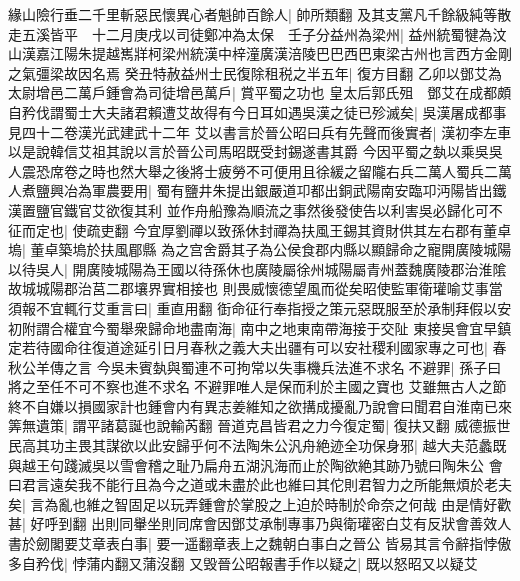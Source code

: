 緣山險行垂二千里斬惡民懷異心者魁帥百餘人|{
	帥所類翻}
及其支黨凡千餘級純等散走五溪皆平　十二月庚戌以司徒鄭冲為太保　壬子分益州為梁州|{
	益州統蜀犍為汶山漢嘉江陽朱提越嶲牂柯梁州統漢中梓潼廣漢涪陵巴巴西巴東梁古州也言西方金剛之氣彊梁故因名焉}
癸丑特赦益州士民復除租税之半五年|{
	復方目翻}
乙卯以鄧艾為太尉增邑二萬戶鍾會為司徒增邑萬戶|{
	賞平蜀之功也}
皇太后郭氏殂　鄧艾在成都頗自矜伐謂蜀士大夫諸君賴遭艾故得有今日耳如遇吳漢之徒已殄滅矣|{
	吳漢屠成都事見四十二卷漢光武建武十二年}
艾以書言於晉公昭曰兵有先聲而後實者|{
	漢初李左車以是說韓信艾祖其說以言於晉公司馬昭既受封錫遂書其爵}
今因平蜀之埶以乘吳吳人震恐席卷之時也然大舉之後將士疲勞不可便用且徐緩之留隴右兵二萬人蜀兵二萬人煮鹽興冶為軍農要用|{
	蜀有鹽井朱提出銀嚴道卭都出銅武陽南安臨卭沔陽皆出鐵漢置鹽官鐵官艾欲復其利}
並作舟船豫為順流之事然後發使告以利害吳必歸化可不征而定也|{
	使疏吏翻}
今宜厚劉禪以致孫休封禪為扶風王錫其資財供其左右郡有董卓塢|{
	董卓築塢於扶風郿縣}
為之宫舍爵其子為公侯食郡内縣以顯歸命之寵開廣陵城陽以待吳人|{
	開廣陵城陽為王國以待孫休也廣陵屬徐州城陽屬青州蓋魏廣陵郡治淮隂故城城陽郡治莒二郡壤界實相接也}
則畏威懷德望風而從矣昭使監軍衛瓘喻艾事當須報不宜輒行艾重言曰|{
	重直用翻}
衘命征行奉指授之策元惡既服至於承制拜假以安初附謂合權宜今蜀舉衆歸命地盡南海|{
	南中之地東南帶海接于交阯}
東接吳會宜早鎮定若待國命往復道途延引日月春秋之義大夫出疆有可以安社稷利國家專之可也|{
	春秋公羊傳之言}
今吳未賓埶與蜀連不可拘常以失事機兵法進不求名不避罪|{
	孫子曰將之至任不可不察也進不求名不避罪唯人是保而利於主國之寶也}
艾雖無古人之節終不自嫌以損國家計也鍾會内有異志姜維知之欲搆成擾亂乃說會曰聞君自淮南已來筭無遺策|{
	謂平諸葛誕也說輸芮翻}
晉道克昌皆君之力今復定蜀|{
	復扶又翻}
威德振世民高其功主畏其謀欲以此安歸乎何不法陶朱公汎舟絶迹全功保身邪|{
	越大夫范蠡既與越王句踐滅吳以雪會稽之耻乃扁舟五湖汎海而止於陶欲絶其跡乃號曰陶朱公}
會曰君言遠矣我不能行且為今之道或未盡於此也維曰其佗則君智力之所能無煩於老夫矣|{
	言為亂也維之智固足以玩弄鍾會於掌股之上迫於時制於命奈之何哉}
由是情好歡甚|{
	好呼到翻}
出則同轝坐則同席會因鄧艾承制專事乃與衛瓘密白艾有反狀會善效人書於劒閣要艾章表白事|{
	要一遥翻章表上之魏朝白事白之晉公}
皆易其言令辭指悖傲多自矜伐|{
	悖蒲内翻又蒲沒翻}
又毁晉公昭報書手作以疑之|{
	既以怒昭又以疑艾}


